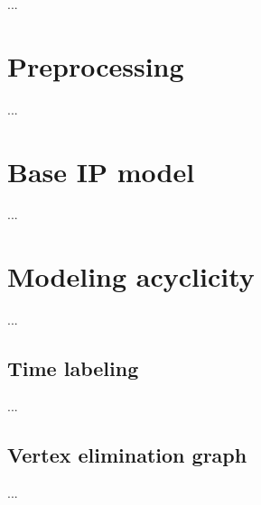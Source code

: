 ...

\section{Preprocessing}
...

\section{Base IP model}
...

\section{Modeling acyclicity}
...

\subsection{Time labeling}
...

\subsection{Vertex elimination graph}
...

